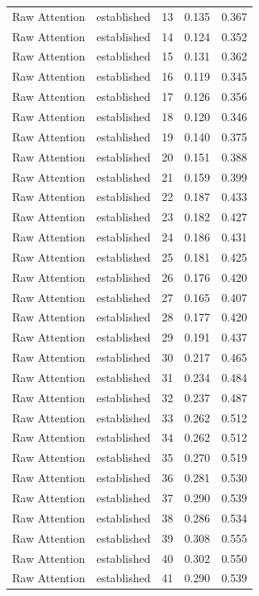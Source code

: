 \begin{tabular}{llrrr}
Raw Attention & established & 13 & 0.135 & 0.367 \\
Raw Attention & established & 14 & 0.124 & 0.352 \\
Raw Attention & established & 15 & 0.131 & 0.362 \\
Raw Attention & established & 16 & 0.119 & 0.345 \\
Raw Attention & established & 17 & 0.126 & 0.356 \\
Raw Attention & established & 18 & 0.120 & 0.346 \\
Raw Attention & established & 19 & 0.140 & 0.375 \\
Raw Attention & established & 20 & 0.151 & 0.388 \\
Raw Attention & established & 21 & 0.159 & 0.399 \\
Raw Attention & established & 22 & 0.187 & 0.433 \\
Raw Attention & established & 23 & 0.182 & 0.427 \\
Raw Attention & established & 24 & 0.186 & 0.431 \\
Raw Attention & established & 25 & 0.181 & 0.425 \\
Raw Attention & established & 26 & 0.176 & 0.420 \\
Raw Attention & established & 27 & 0.165 & 0.407 \\
Raw Attention & established & 28 & 0.177 & 0.420 \\
Raw Attention & established & 29 & 0.191 & 0.437 \\
Raw Attention & established & 30 & 0.217 & 0.465 \\
Raw Attention & established & 31 & 0.234 & 0.484 \\
Raw Attention & established & 32 & 0.237 & 0.487 \\
Raw Attention & established & 33 & 0.262 & 0.512 \\
Raw Attention & established & 34 & 0.262 & 0.512 \\
Raw Attention & established & 35 & 0.270 & 0.519 \\
Raw Attention & established & 36 & 0.281 & 0.530 \\
Raw Attention & established & 37 & 0.290 & 0.539 \\
Raw Attention & established & 38 & 0.286 & 0.534 \\
Raw Attention & established & 39 & 0.308 & 0.555 \\
Raw Attention & established & 40 & 0.302 & 0.550 \\
Raw Attention & established & 41 & 0.290 & 0.539 \\

\end{tabular}
